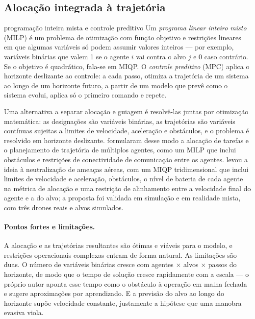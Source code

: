 \subsection{Alocação integrada à trajetória}

\begin{conceitobox}{programação inteira mista e controle preditivo}
Um \emph{programa linear inteiro misto} (MILP) é um problema de otimização com função objetivo e restrições lineares em
que algumas variáveis só podem assumir valores inteiros --- por exemplo, variáveis binárias que valem 1 se o agente $i$ vai
contra o alvo $j$ e 0 caso contrário. Se o objetivo é quadrático, fala-se em MIQP. O \emph{controle preditivo} (MPC)
aplica o horizonte deslizante ao controle: a cada passo, otimiza a trajetória de um sistema ao longo de um horizonte
futuro, a partir de um modelo que prevê como o sistema evolui, aplica só o primeiro comando e repete.
\end{conceitobox}

Uma alternativa a separar alocação e guiagem é resolvê-las juntas por otimização matemática: as designações são variáveis
binárias, as trajetórias são variáveis contínuas sujeitas a limites de velocidade, aceleração e obstáculos, e o problema é
resolvido em horizonte deslizante. \citet{afonso2020} formularam desse modo a alocação de tarefas e o planejamento de
trajetória de múltiplos agentes, como um MILP que inclui obstáculos e restrições de conectividade de comunicação entre os
agentes. \citet{cruz2025} levou a ideia à neutralização de ameaças aéreas, com um MIQP tridimensional que inclui limites
de velocidade e aceleração, obstáculos, o nível de bateria de cada agente na métrica de alocação e uma restrição de
alinhamento entre a velocidade final do agente e a do alvo; a proposta foi validada em simulação e em realidade mista, com
três drones reais e alvos simulados.

\paragraph{Pontos fortes e limitações.} A alocação e as trajetórias resultantes são ótimas e viáveis para o modelo, e
restrições operacionais complexas entram de forma natural. As limitações são duas. O número de variáveis binárias cresce
com agentes $\times$ alvos $\times$ passos do horizonte, de modo que o tempo de solução cresce rapidamente com a escala ---
o próprio autor aponta esse tempo como o obstáculo à operação em malha fechada e sugere aproximações por aprendizado. E a
previsão do alvo ao longo do horizonte supõe velocidade constante, justamente a hipótese que uma manobra evasiva viola.

